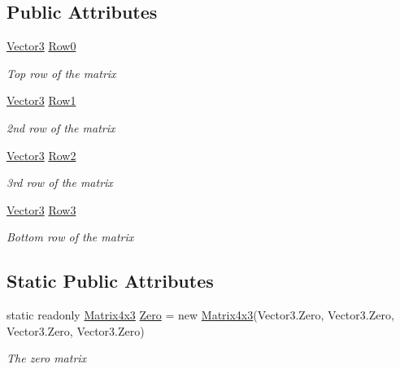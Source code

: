 \subsection*{Public Attributes}
\begin{DoxyCompactItemize}
\item 
\hyperlink{struct_open_t_k_1_1_vector3}{Vector3} \hyperlink{struct_open_t_k_1_1_matrix4x3_afa565d76d843dfb9867070fac7eae957}{Row0}
\begin{DoxyCompactList}\small\item\em Top row of the matrix \end{DoxyCompactList}\item 
\hyperlink{struct_open_t_k_1_1_vector3}{Vector3} \hyperlink{struct_open_t_k_1_1_matrix4x3_a3799713d1c249f139aa43508b15192c7}{Row1}
\begin{DoxyCompactList}\small\item\em 2nd row of the matrix \end{DoxyCompactList}\item 
\hyperlink{struct_open_t_k_1_1_vector3}{Vector3} \hyperlink{struct_open_t_k_1_1_matrix4x3_a4287fa1551e8a526ef352fd42b4e2b4b}{Row2}
\begin{DoxyCompactList}\small\item\em 3rd row of the matrix \end{DoxyCompactList}\item 
\hyperlink{struct_open_t_k_1_1_vector3}{Vector3} \hyperlink{struct_open_t_k_1_1_matrix4x3_a8650610271ac5bd0afee0b96d1ffe5b9}{Row3}
\begin{DoxyCompactList}\small\item\em Bottom row of the matrix \end{DoxyCompactList}\end{DoxyCompactItemize}
\subsection*{Static Public Attributes}
\begin{DoxyCompactItemize}
\item 
static readonly \hyperlink{struct_open_t_k_1_1_matrix4x3}{Matrix4x3} \hyperlink{struct_open_t_k_1_1_matrix4x3_aafb18f8d0a699fc8d0b85a18f415b8ef}{Zero} = new \hyperlink{struct_open_t_k_1_1_matrix4x3}{Matrix4x3}(Vector3.\-Zero, Vector3.\-Zero, Vector3.\-Zero, Vector3.\-Zero)
\begin{DoxyCompactList}\small\item\em The zero matrix \end{DoxyCompactList}\end{DoxyCompactItemize}
